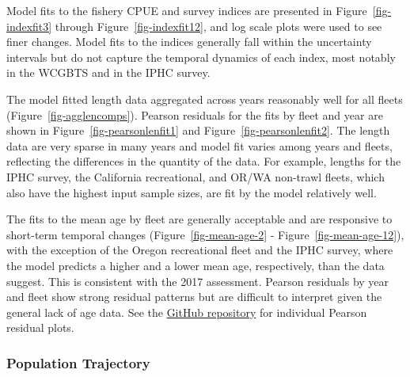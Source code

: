 \documentclass[
]{scrartcl}
\begin{document}
Model fits to the fishery CPUE and survey indices are presented in
Figure~\ref{fig-indexfit3} through Figure~\ref{fig-indexfit12}, and log
scale plots were used to see finer changes. Model fits to the indices
generally fall within the uncertainty intervals but do not capture the
temporal dynamics of each index, most notably in the WCGBTS and in the
IPHC survey.

The model fitted length data aggregated across years reasonably well for
all fleets (Figure~\ref{fig-agglencomps}). Pearson residuals for the
fits by fleet and year are shown in Figure~\ref{fig-pearsonlenfit1} and
Figure~\ref{fig-pearsonlenfit2}. The length data are very sparse in many
years and model fit varies among years and fleets, reflecting the
differences in the quantity of the data. For example, lengths for the
IPHC survey, the California recreational, and OR/WA non-trawl fleets,
which also have the highest input sample sizes, are fit by the model
relatively well.

The fits to the mean age by fleet are generally acceptable and are
responsive to short-term temporal changes (Figure~\ref{fig-mean-age-2} -
Figure~\ref{fig-mean-age-12}), with the exception of the Oregon
recreational fleet and the IPHC survey, where the model predicts a
higher and a lower mean age, respectively, than the data suggest. This
is consistent with the 2017 assessment. Pearson residuals by year and
fleet show strong residual patterns but are difficult to interpret given
the general lack of age data. See the
\href{https://github.com/rclairer/Sebastes_ruberrimus_2025}{GitHub
repository} for individual Pearson residual plots.

\subsubsection{Population Trajectory}\label{population-trajectory}
\end{document}
